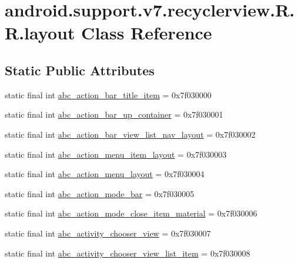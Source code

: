 \hypertarget{classandroid_1_1support_1_1v7_1_1recyclerview_1_1_r_1_1layout}{
\section{android.support.v7.recyclerview.R.R.layout Class Reference}
\label{classandroid_1_1support_1_1v7_1_1recyclerview_1_1_r_1_1layout}
}
\subsection*{Static Public Attributes}
\begin{CompactItemize}
\item 
static final int \hyperlink{classandroid_1_1support_1_1v7_1_1recyclerview_1_1_r_1_1layout_5ffee5e6c02762302ff56e03b4e92d9e}{abc\_\-action\_\-bar\_\-title\_\-item} = 0x7f030000
\item 
static final int \hyperlink{classandroid_1_1support_1_1v7_1_1recyclerview_1_1_r_1_1layout_5d2329cdfa81813259888f69260d09dd}{abc\_\-action\_\-bar\_\-up\_\-container} = 0x7f030001
\item 
static final int \hyperlink{classandroid_1_1support_1_1v7_1_1recyclerview_1_1_r_1_1layout_53a6c97bbe5df804330bc5bb121e9dc8}{abc\_\-action\_\-bar\_\-view\_\-list\_\-nav\_\-layout} = 0x7f030002
\item 
static final int \hyperlink{classandroid_1_1support_1_1v7_1_1recyclerview_1_1_r_1_1layout_8927e3b2b9fa9ed34f3ee37d74189e75}{abc\_\-action\_\-menu\_\-item\_\-layout} = 0x7f030003
\item 
static final int \hyperlink{classandroid_1_1support_1_1v7_1_1recyclerview_1_1_r_1_1layout_9d4dfe428188577d103aef6469e20044}{abc\_\-action\_\-menu\_\-layout} = 0x7f030004
\item 
static final int \hyperlink{classandroid_1_1support_1_1v7_1_1recyclerview_1_1_r_1_1layout_06efa3cf6420121f6ab25df1fbef1c93}{abc\_\-action\_\-mode\_\-bar} = 0x7f030005
\item 
static final int \hyperlink{classandroid_1_1support_1_1v7_1_1recyclerview_1_1_r_1_1layout_e4de5b58eb6c48854796348e1f0e968b}{abc\_\-action\_\-mode\_\-close\_\-item\_\-material} = 0x7f030006
\item 
static final int \hyperlink{classandroid_1_1support_1_1v7_1_1recyclerview_1_1_r_1_1layout_c41c4d847b736a42396742c6dc256284}{abc\_\-activity\_\-chooser\_\-view} = 0x7f030007
\item 
static final int \hyperlink{classandroid_1_1support_1_1v7_1_1recyclerview_1_1_r_1_1layout_396c6a29ef6246354b0df79419bbdc34}{abc\_\-activity\_\-chooser\_\-view\_\-list\_\-item} = 0x7f030008

\end{CompactItemize}

